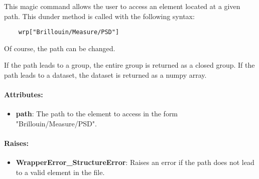This magic command allows the user to access an element located at a given path. This dunder method is called with the following syntax:
\begin{lstlisting}
    wrp["Brillouin/Measure/PSD"]
\end{lstlisting}

Of course, the path can be changed. 

If the path leads to a group, the entire group is returned as a closed group. If the path leads to a dataset, the dataset is returned as a numpy array.

\paragraph{Attributes:}

\begin{itemize}
    \item \textbf{path}: The path to the element to access in the form "Brillouin/Measure/PSD".
\end{itemize}

\paragraph{Raises:}

\begin{itemize}    
    \item \textbf{WrapperError\_StructureError}: Raises an error if the path does not lead to a valid element in the file.
\end{itemize}